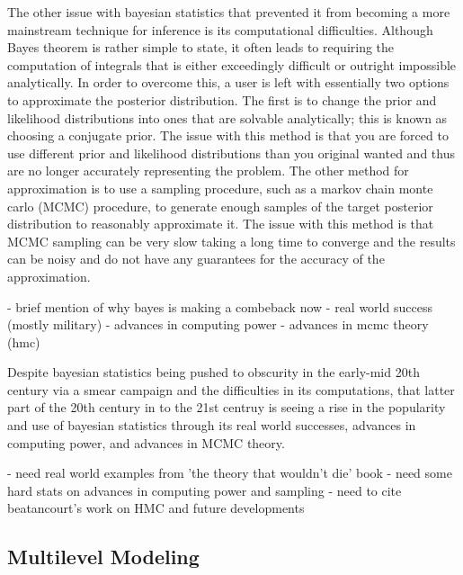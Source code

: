 The other issue with bayesian statistics that prevented it from becoming a more mainstream technique for inference is its computational difficulties. Although Bayes theorem is rather simple to state, it often leads to requiring the computation of integrals that is either exceedingly difficult or outright impossible analytically. In order to overcome this, a user is left with essentially two options to approximate the posterior distribution. The first is to change the prior and likelihood distributions into ones that are solvable analytically; this is known as choosing a conjugate prior. The issue with this method is that you are forced to use different prior and likelihood distributions than you original wanted and thus are no longer accurately representing the problem. The other method for approximation is to use a sampling procedure, such as a markov chain monte carlo (MCMC) procedure, to generate enough samples of the target posterior distribution to reasonably approximate it. The issue with this method is that MCMC sampling can be very slow taking a long time to converge and the results can be noisy and do not have any guarantees for the accuracy of the approximation.

- brief mention of why bayes is making a combeback now
- real world success (mostly military)
- advances in computing power
- advances in mcmc theory (hmc)

Despite bayesian statistics being pushed to obscurity in the early-mid 20th century via a smear campaign and the difficulties in its computations, that latter part of the 20th century in to the 21st centruy is seeing a rise in the popularity and use of bayesian statistics through its real world successes, advances in computing power, and advances in MCMC theory.

- need real world examples from 'the theory that wouldn't die' book
- need some hard stats on advances in computing power and sampling
- need to cite beatancourt's work on HMC and future developments

\subsection{Multilevel Modeling}

